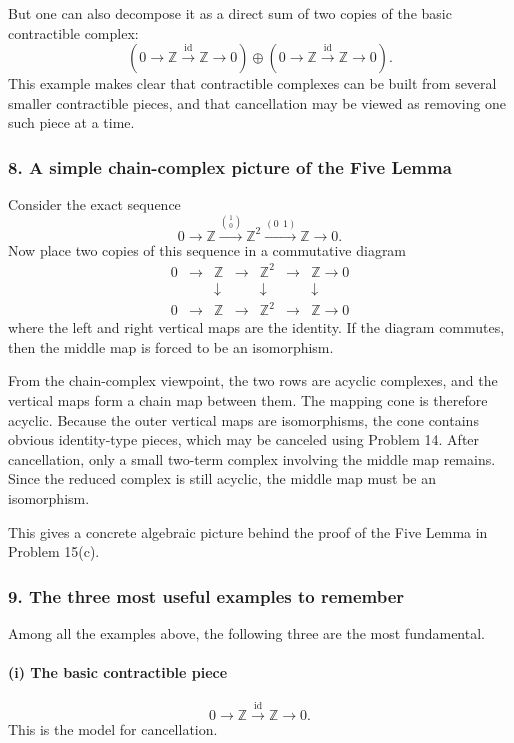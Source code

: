 \documentclass[12pt,a4paper]{article}
\theoremstyle{notespace}
\begin{document}
But one can also decompose it as a direct sum of two copies of the basic contractible complex:
\[
\left(0\to \mathbb Z \xrightarrow{\mathrm{id}} \mathbb Z\to 0\right)
\oplus
\left(0\to \mathbb Z \xrightarrow{\mathrm{id}} \mathbb Z\to 0\right).
\]
This example makes clear that contractible complexes can be built from several smaller contractible pieces, and that cancellation may be viewed as removing one such piece at a time.

\subsubsection*{8. A simple chain-complex picture of the Five Lemma}

Consider the exact sequence
\[
0\to \mathbb Z \xrightarrow{\binom{1}{0}} \mathbb Z^2 \xrightarrow{(0\ \ 1)} \mathbb Z \to 0.
\]
Now place two copies of this sequence in a commutative diagram
\[
\begin{array}{ccccccc}
	0 &\to& \mathbb Z &\to& \mathbb Z^2 &\to& \mathbb Z \to 0\\
	&& \downarrow && \downarrow && \downarrow \\
	0 &\to& \mathbb Z &\to& \mathbb Z^2 &\to& \mathbb Z \to 0
\end{array}
\]
where the left and right vertical maps are the identity. If the diagram commutes, then the middle map is forced to be an isomorphism.

From the chain-complex viewpoint, the two rows are acyclic complexes, and the vertical maps form a chain map between them. The mapping cone is therefore acyclic. Because the outer vertical maps are isomorphisms, the cone contains obvious identity-type pieces, which may be canceled using Problem 14. After cancellation, only a small two-term complex involving the middle map remains. Since the reduced complex is still acyclic, the middle map must be an isomorphism.

This gives a concrete algebraic picture behind the proof of the Five Lemma in Problem 15(c).

\subsubsection*{9. The three most useful examples to remember}

Among all the examples above, the following three are the most fundamental.

\paragraph{(i) The basic contractible piece}
\[
0\to \mathbb Z \xrightarrow{\mathrm{id}} \mathbb Z \to 0.
\]
This is the model for cancellation.
\end{document}
